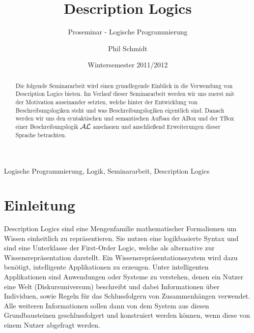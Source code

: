\documentclass[runningheads,a4paper]{llncs}
\newcommand{\keywords}[1]{\par\addvspace\baselineskip
\noindent\keywordname\enspace\ignorespaces#1}
\begin{document}
\mainmatter

\title{Description Logics}
\subtitle{Proseminar - Logische Programmierung}
\date{Wintersemester 2011/2012}

\author{Phil Schmidt}


\maketitle
\begin{abstract}
Die folgende Seminararbeit wird einen grundlegende Einblick in die Verwendung von Description Logics bieten.  Im Verlauf dieser Seminararbeit werden wir uns zuerst mit der Motivation auseinander setzten, welche hinter der Entwicklung von Beschreibungslogiken steht und was Beschreibungslogiken eigentlich sind. Danach werden wir uns den syntaktischen und semantischen Aufbau der ABox und der TBox einer Beschreibungslogik $\cal{AL}$ anschauen und anschließend Erweiterungen dieser Sprache betrachten.

\end{abstract}

\keywords{Logische Programmierung, Logik, Seminararbeit, Description Logics}

\section{Einleitung}

Description Logics sind eine Mengenfamilie mathematischer Formalismen um Wissen einheitlich zu repräsentieren. Sie nutzen eine logikbasierte Syntax und sind eine Unterklasse der First-Order Logic, welche als alternative zur Wissensrepräsentation darstellt. Ein Wissensrepräsentationssystem wird dazu benötigt, intelligente Applikationen zu erzeugen. Unter intelligenten Applikationen sind Anwendungen oder Systeme zu verstehen, denen ein Nutzer eine Welt (Diskursuniversum) beschreibt und dabei Informationen über Individuen, sowie Regeln für das Schlussfolgern von Zusammenhängen verwendet. Alle weiteren Informationen sollen dann von dem System aus diesen Grundbausteinen geschlussfolgert und konstruiert werden können, wenn diese von einem Nutzer abgefragt werden.
\end{document}
